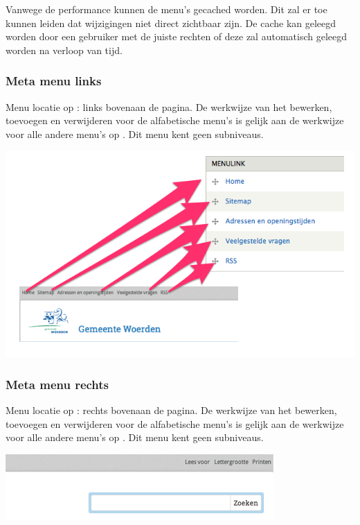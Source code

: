 \bigskip

Vanwege de performance kunnen de menu's gecached worden. Dit zal er toe kunnen leiden dat wijzigingen niet direct zichtbaar zijn. De cache kan geleegd worden door een gebruiker met de juiste rechten of deze zal automatisch geleegd worden na verloop van tijd.

\bigskip

\subsubsection{Meta menu links}\label{metamenulinks}
Menu locatie op \drupalpath{}: links bovenaan de pagina. De werkwijze van het bewerken, toevoegen en verwijderen voor de alfabetische menu's is gelijk aan de werkwijze voor alle andere menu's op \drupalpath{}. Dit menu kent geen subniveaus.
\bigskip

\begin{center}
	\includegraphics[width=\textwidth]{img/meta-menu.png}
\end{center}

\bigskip

\subsubsection{Meta menu rechts}\label{metamenurechts}
Menu locatie op \drupalpath{}: rechts bovenaan de pagina. De werkwijze van het bewerken, toevoegen en verwijderen voor de alfabetische menu's is gelijk aan de werkwijze voor alle andere menu's op \drupalpath{}. Dit menu kent geen subniveaus.
\bigskip

\begin{center}
	\includegraphics[width=\textwidth]{img/menu_metarechts.png}
\end{center}


